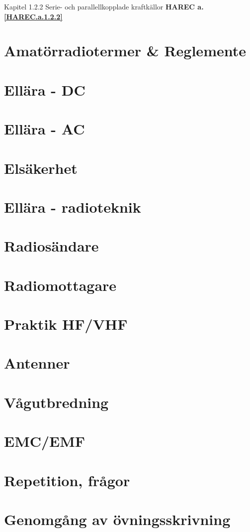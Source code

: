 \documentclass[a4paper,twoside,openright]{article}
\begin{document}
Kapitel 1.2.2 Serie- och parallellkopplade kraftkällor
\textbf{HAREC a.\ref{HAREC.a.1.2.2}\label{myHAREC.a.1.2.2}}

\section{Amatörradiotermer & Reglemente}

\section{Ellära - DC}
\section{Ellära - AC}

\section{Elsäkerhet}
\section{Ellära - radioteknik}
\section{Radiosändare}
\section{Radiomottagare}
\section{Praktik HF/VHF}
\section{Antenner}

\section{Vågutbredning}
\section{EMC/EMF}
\section{Repetition, frågor}
\section{Genomgång av övningsskrivning}

\appendix



\onecolumn



\backmatter
\end{document}
